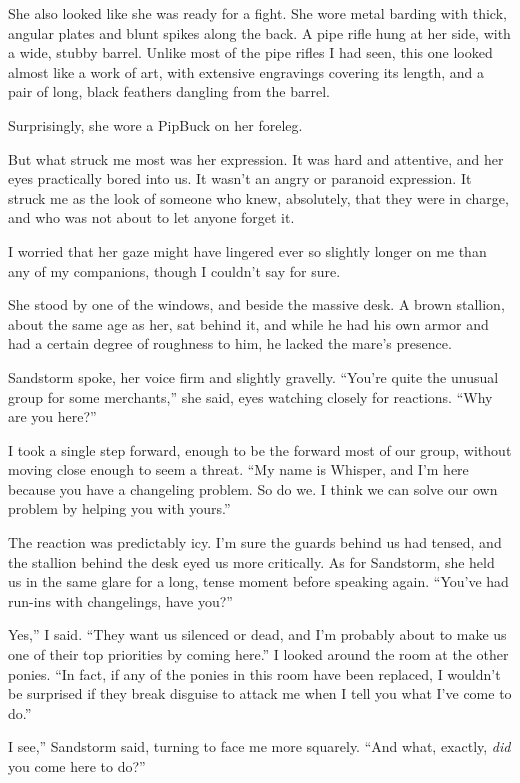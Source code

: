She also looked like she was ready for a fight. She wore metal barding with thick, angular plates and blunt spikes along the back. A pipe rifle hung at her side, with a wide, stubby barrel. Unlike most of the pipe rifles I had seen, this one looked almost like a work of art, with extensive engravings covering its length, and a pair of long, black feathers dangling from the barrel.

Surprisingly, she wore a PipBuck on her foreleg.

But what struck me most was her expression. It was hard and attentive, and her eyes practically bored into us. It wasn’t an angry or paranoid expression. It struck me as the look of someone who knew, absolutely, that they were in charge, and who was not about to let anyone forget it.

I worried that her gaze might have lingered ever so slightly longer on me than any of my companions, though I couldn’t say for sure.

She stood by one of the windows, and beside the massive desk. A brown stallion, about the same age as her, sat behind it, and while he had his own armor and had a certain degree of roughness to him, he lacked the mare’s presence.

Sandstorm spoke, her voice firm and slightly gravelly. “You’re quite the unusual group for some merchants,” she said, eyes watching closely for reactions. “Why are you here?”

I took a single step forward, enough to be the forward most of our group, without moving close enough to seem a threat. “My name is Whisper, and I’m here because you have a changeling problem. So do we. I think we can solve our own problem by helping you with yours.”

The reaction was predictably icy. I’m sure the guards behind us had tensed, and the stallion behind the desk eyed us more critically. As for Sandstorm, she held us in the same glare for a long, tense moment before speaking again. “You’ve had run-ins with changelings, have you?”

\leavevmode{}Yes,” I said. “They want us silenced or dead, and I’m probably about to make us one of their top priorities by coming here.” I looked around the room at the other ponies. “In fact, if any of the ponies in this room have been replaced, I wouldn’t be surprised if they break disguise to attack me when I tell you what I’ve come to do.”

\leavevmode{}I see,” Sandstorm said, turning to face me more squarely. “And what, exactly, \textit{did} you come here to do?”


